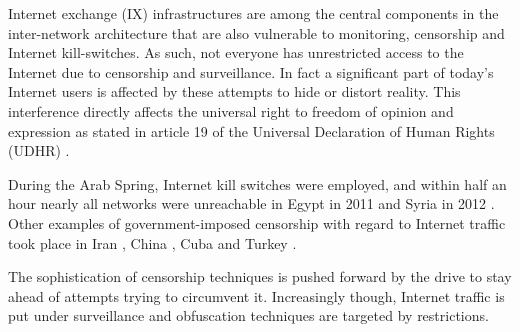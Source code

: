 Internet exchange (IX) infrastructures are among the central components in the inter-network architecture that are also vulnerable to monitoring, censorship and Internet kill-switches.
As such, not everyone has unrestricted access to the Internet due to censorship and surveillance.
In fact a significant part of today's Internet users is affected by these attempts to hide or distort reality. %
This interference directly affects the universal right to freedom of opinion and expression as stated in article 19 of the Universal Declaration of Human Rights (UDHR) \cite{UDHR}.

During the Arab Spring, Internet kill switches were employed, and within half an hour nearly all networks were unreachable in Egypt in 2011 \cite{renesys2011egypt} and Syria in 2012 \cite{renesys2012syria}.
Other examples of government-imposed censorship with regard to Internet traffic took place in Iran \cite{halderman2013iran}, China \cite{nyt2015appleChina, hrw2006china}, Cuba \cite{watts2014havana} and Turkey \cite{twitter2015turkey}.

The sophistication of censorship techniques is pushed forward by the drive to stay ahead of attempts trying to circumvent it.
Increasingly though, Internet traffic is put under surveillance and obfuscation techniques are targeted by restrictions. \cite{survey_brussee}


